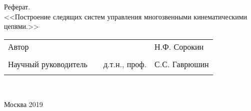 \documentclass[a4paper]{article}
\begin{document}
\begin{center}
\hfill \break
\hfill\break
\hfill \break
\hfill \break
\hfill \break
\hfill \break
\hfill \break
\hfill \break
\hfill \break
\large{Реферат.}\\
\large{<<Построение следящих систем управления многозвенными кинематическими цепями.>>}\\
\hfill \break
\hfill \break
\hfill \break
\hfill \break
\hfill \break
\hfill \break
\hfill \break
\hfill \break
\end{center}
 
\normalsize{ 
\begin{tabular}{lccl}
Автор  & \underline{\hspace{3cm}} & &Н.Ф. Сорокин\\\\
Научный руководитель & \underline{\hspace{3cm}}& д.т.н., проф. & С.С. Гаврюшин \\\\
\end{tabular}
}\\
\hfill \break
\hfill \break
\hfill \break
\hfill \break
\begin{center} Москва 2019 \end{center}
\thispagestyle{empty} %
\newpage

\tableofcontents

\newcommand{\cinput}[1]{
	
}

\cinput{src/introduction.tex}
\cinput{src/ctrobj.tex}
\cinput{src/htrans.tex}
\cinput{src/frames.tex}
\cinput{src/straight.tex}
\cinput{src/inverse.tex}
\cinput{src/track.tex}
\cinput{src/lerp.tex}
\cinput{src/restr_coord.tex}
\cinput{src/restr_traj.tex}
\cinput{src/localbase.tex}
\cinput{src/tree.tex}
\cinput{src/findings.tex}
\cinput{src/litres.tex}
\end{document}
